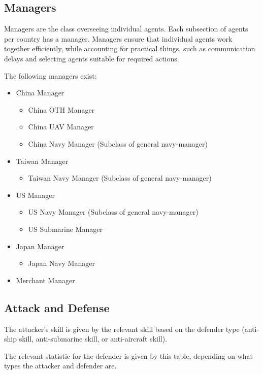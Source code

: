 \documentclass{article}
\begin{document}
\subsection{Managers}
Managers are the class overseeing individual agents. Each subsection of agents per country has a manager. Managers ensure that individual agents work together efficiently, while accounting for practical things, such as communication delays and selecting agents suitable for required actions.

\noindent The following managers exist:
\begin{itemize}
    \item China Manager
    \begin{itemize}
        \item China OTH Manager
        \item China UAV Manager
        \item China Navy Manager (Subclass of general navy-manager)
    \end{itemize}
    \item Taiwan Manager
    \begin{itemize}
        \item Taiwan Navy Manager (Subclass of general navy-manager)
    \end{itemize}
    \item US Manager
    \begin{itemize}
        \item US Navy Manager (Subclass of general navy-manager)
        \item US Submarine Manager
    \end{itemize}
    \item Japan Manager
    \begin{itemize}
        \item Japan Navy Manager 
    \end{itemize}
    \item Merchant Manager
\end{itemize}

\subsection{Attack and Defense}

The attacker's skill is given by the relevant skill based on the defender type (anti-ship skill, anti-submarine skill, or anti-aircraft skill).

The relevant statistic for the defender is given by this table, depending on what types the attacker and defender are.
\end{document}
